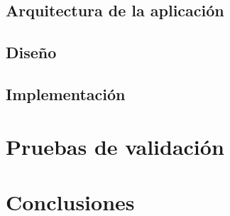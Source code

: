 \documentclass[11pt,a4paper]{book}
\begin{document}
\section{Arquitectura de la aplicación}


\section{Diseño}


\section{Implementación}


\chapter{Pruebas de validación}


\chapter{Conclusiones}


\printbibliography[heading=bibnumbered]

%
\end{document}
